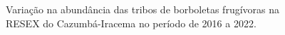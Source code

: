\documentclass[
  letterpaper,
]{scrbook}
\begin{document}
\begin{figure}[H]


\caption{\label{fig-abundancia-resex-cazumba-iracema}Variação na
abundância das tribos de borboletas frugívoras na RESEX do
Cazumbá-Iracema no período de 2016 a 2022.}

\end{figure}%
\end{document}
